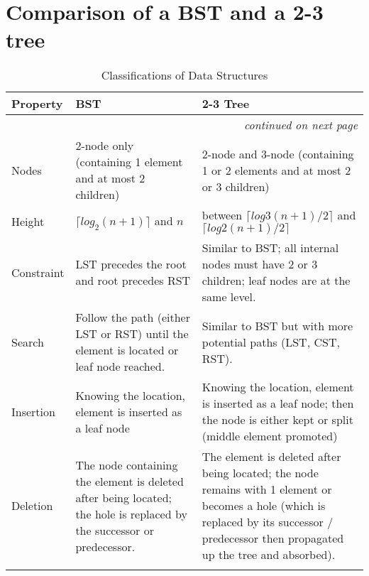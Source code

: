 \section{Comparison of a BST and a 2-3 tree}
    
{\RaggedRight \centering
    \begin{longtable}{p{} p{} p{}}
    \textbf{Property} & \textbf{BST} & \textbf{2-3 Tree}\\
    \hline
    \hline
    \endhead

    \multicolumn{3}{r}{\footnotesize\itshape continued on next page}\\
    \endfoot 

    \endlastfoot

    Nodes & 2-node only (containing 1 element and at most 2 children) & 2-node and 3-node (containing 1 or 2 elements and at most 2 or 3 children)\\
    \hline
    Height & $\lceil log_2(n+1) \rceil$ and $n$ & between $\lceil log3 (n+1)/2 \rceil$ and $\lceil log2 (n+1)/2 \rceil$\\
    \hline
    Constraint & LST precedes the root and root precedes RST & Similar to BST; all internal nodes must have 2 or 3 children; leaf nodes are at the same level.\\
    \hline
    Search & Follow the path (either LST or RST) until the element is located or leaf node reached. & Similar to BST but with more potential paths (LST, CST, RST).\\
    \hline
    Insertion & Knowing the location, element is inserted as a leaf node & Knowing the location, element is inserted as a leaf node; then the node is either kept or split (middle element promoted)\\
    \hline
    Deletion & The node containing the element is deleted after being located; the hole is replaced by the successor or predecessor. & The element is deleted after being located; the node remains with 1 element or becomes a hole (which is replaced by its successor / predecessor then propagated up the tree and absorbed).\\
    \hline
    
    \caption{Classifications of Data Structures}
    \end{longtable}
} %

